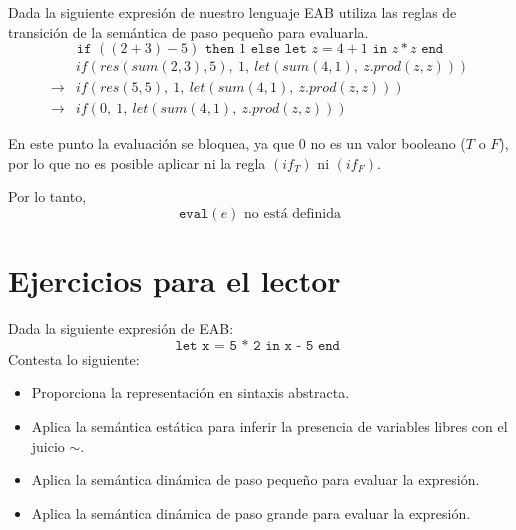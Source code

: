     \begin{exercise}
    	Dada la siguiente expresión de nuestro lenguaje \textsf{EAB} utiliza las reglas de transición de la semántica de paso pequeño para evaluarla.
    	\[
    	\texttt{if } ((2 + 3) - 5) \texttt{ then } 1 \texttt{ else } \texttt{let } z = 4 + 1 \texttt{ in } z * z \texttt{ end}
    	\]
    	\[
    	\begin{array}{cl}
    		&\textit{if}(\textit{res}(\textit{sum}(2,3),5),\ 1,\ \textit{let}(\textit{sum}(4,1),\ z.\textit{prod}(z,z)))\\
    		\rightarrow &\textit{if}(\textit{res}(5,5),\ 1,\ \textit{let}(\textit{sum}(4,1),\ z.\textit{prod}(z,z)))\\
    		\rightarrow &\textit{if}(0,\ 1,\ \textit{let}(\textit{sum}(4,1),\ z.\textit{prod}(z,z)))
    	\end{array}
    	\]
    	
    	En este punto la evaluación se bloquea, ya que $0$ no es un valor booleano ($T$ o $F$), por lo que no es posible aplicar ni la regla $(if_T)$ ni $(if_F)$.
    	
    	Por lo tanto,
    	\[
    	\texttt{eval}(e) \text{ no está definida}
    	\]
    \end{exercise}
    
    
    \section{Ejercicios para el lector}

	\begin{exercise}
		Dada la siguiente expresión de \textsf{EAB}:
		$$ \texttt{let x = 5 * 2 in x - 5 end }$$
		Contesta lo siguiente:		
		\begin{itemize}
			\item Proporciona la representación en sintaxis abstracta.
			\item Aplica la semántica estática para inferir la presencia de variables libres con el juicio $ \sim $.
			\item Aplica la semántica dinámica de paso pequeño para evaluar la expresión.
			\item Aplica la semántica dinámica de paso grande para evaluar la expresión.
		\end{itemize}
	\end{exercise}

